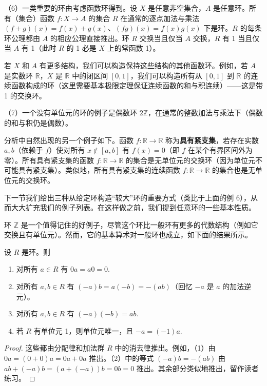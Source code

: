 \begin{example}
（6）一类重要的环由考虑函数环得到。设 \(X\) 是任意非空集合，\(A\) 是任意环。所有（集合）函数 \(f : X \to A\) 的集合 \(R\) 在通常的逐点加法与乘法 \((f+g)(x) = f(x)+g(x)\)、\((fg)(x) = f(x)g(x)\) 下是环。\(R\) 的每条环公理都由 \(A\) 的相应公理直接推出。环 \(R\) 交换当且仅当 \(A\) 交换，\(R\) 有 1 当且仅当 \(A\) 有 1（此时 \(R\) 的 1 必是 \(X\) 上的常函数 1）。

若 \(X\) 和 \(A\) 有更多结构，我们可以构造保持这些结构的其他函数环。例如，若 \(A\) 是实数环 \(\mathbb{R}\)，\(X\) 是 \(\mathbb{R}\) 中的闭区间 \([0,1]\)，我们可以构造所有从 \([0,1]\) 到 \(\mathbb{R}\) 的连续函数构成的环（这里需要基本极限定理保证连续函数的和与积连续）——这是带 1 的交换环。

（7）一个没有单位元的环的例子是偶数环 \(2\mathbb{Z}\)，在通常的整数加法与乘法下（偶数的和与积仍是偶数）。

分析中自然出现的另一个例子如下。函数 \(f : \mathbb{R} \to \mathbb{R}\) 称为\textbf{具有紧支集}，若存在实数 \(a, b\)（依赖于 \(f\)）使对所有 \(x \notin [a,b]\) 有 \(f(x) = 0\)（即 \(f\) 在某个有界区间外为零）。所有具有紧支集的函数 \(f : \mathbb{R} \to \mathbb{R}\) 的集合是无单位元的交换环（因为单位元不可能具有紧支集）。类似地，所有具有紧支集的连续函数 \(f : \mathbb{R} \to \mathbb{R}\) 的集合也是无单位元的交换环。
\end{example}

下一节我们给出三种从给定环构造“较大”环的重要方式（类比于上面的例 6），从而大大扩充我们的例子列表。在这样做之前，我们提到任意环的一些基本性质。

环 \(\mathbb{Z}\) 是一个值得记住的好例子，尽管这个环比一般环有更多的代数结构（例如它交换且有单位元）。然而，它的基本算术对一般环也成立，如下面的结果所示。

\begin{proposition}\label{pro:7.1}
设 \(R\) 是环。则

\begin{enumerate}[label=(\arabic*)]
\item 对所有 \(a \in R\) 有 \(0a = a0 = 0\).
\item 对所有 \(a, b \in R\) 有 \((-a)b = a(-b) = -(ab)\)（回忆 \(-a\) 是 \(a\) 的加法逆元）。
\item 对所有 \(a, b \in R\) 有 \((-a)(-b) = ab\).
\item 若 \(R\) 有单位元 1，则单位元唯一，且 \(-a = (-1)a\).
\end{enumerate}
\end{proposition}

\begin{proof}
这些都由分配律和加法群 \(R\) 中的消去律推出。例如，（1）由 \(0a = (0+0)a = 0a + 0a\) 推出。（2）中的等式 \((-a)b = -(ab)\) 由 \(ab + (-a)b = (a + (-a))b = 0b = 0\) 推出。其余部分类似地推出，留作读者练习。
\end{proof}

